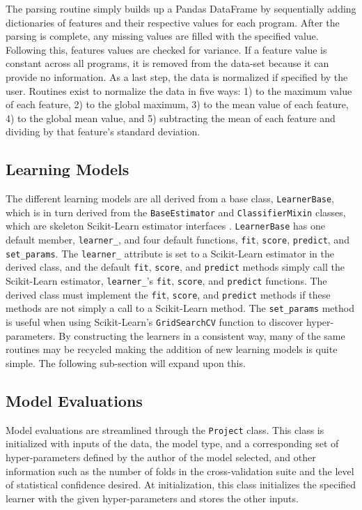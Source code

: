 \documentclass[paper=a4, fontsize=11pt]{scrartcl} %
\begin{document}
The parsing routine simply builds up a Pandas DataFrame by sequentially adding dictionaries of features and their respective values for each program.
After the parsing is complete, any missing values are filled with the specified value.
Following this, features values are checked for variance.
If a feature value is constant across all programs, it is removed from the data-set because it can provide no information.
As a last step, the data is normalized if specified by the user.
Routines exist to normalize the data in five ways: 1) to the maximum value of each feature, 2) to the global maximum, 3) to the mean value of each feature, 4) to the global mean value, and 5) subtracting the mean of each feature and dividing by that feature's standard deviation.

\subsection*{Learning Models}

The different learning models are all derived from a base class, \verb|LearnerBase|, which is in turn derived from the \verb|BaseEstimator| and \verb|ClassifierMixin| classes, which are skeleton Scikit-Learn estimator interfaces \cite{scikit-learn}.
\verb|LearnerBase| has one default member, \verb|learner_|, and four default functions, \verb|fit|, \verb|score|, \verb|predict|, and \verb|set_params|.
The \verb|learner_| attribute is set to a Scikit-Learn estimator in the derived class, and the default \verb|fit|, \verb|score|, and \verb|predict| methods simply call the Scikit-Learn estimator, \verb|learner_|'s \verb|fit|, \verb|score|, and \verb|predict| functions.
The derived class must implement the \verb|fit|, \verb|score|, and \verb|predict| methods if these methods are not simply a call to a Scikit-Learn method.
The \verb|set_params| method is useful when using Scikit-Learn's \verb|GridSearchCV| function to discover hyper-parameters.
By constructing the learners in a consistent way, many of the same routines may be recycled making the addition of new learning models is quite simple.
The following sub-section will expand upon this.
\\

\subsection*{Model Evaluations}

Model evaluations are streamlined through the \verb|Project| class.
This class is initialized with inputs of the data, the model type, and a corresponding set of hyper-parameters defined by the author of the model selected, and other information such as the number of folds in the cross-validation suite and the level of statistical confidence desired.
At initialization, this class initializes the specified learner with the given hyper-parameters and stores the other inputs.
\\
\end{document}
